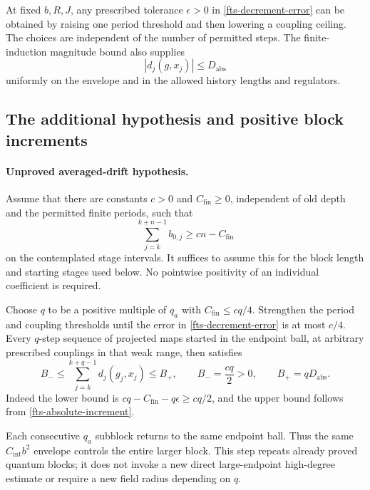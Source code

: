 At fixed $b,R,J$, any prescribed tolerance $\epsilon>0$
in \eqref{fts-decrement-error} can be obtained by raising
one period threshold and then lowering a coupling ceiling.
The choices are independent of the number of permitted
steps. The finite-induction magnitude bound also supplies
\begin{equation}
                 |d_j(g,x_j)|\leq D_{\mathrm{abs}}
 \label{fts-absolute-increment}
\end{equation}
uniformly on the envelope and in the allowed history lengths
and regulators.

\subsection{The additional hypothesis and positive block increments}
\label{fts-hypothesis-section}

\paragraph{Unproved averaged-drift hypothesis.}
Assume that there are constants $c>0$ and
$C_{\mathrm{fin}}\geq0$, independent of old depth and the
permitted finite periods, such that
\begin{equation}
       \sum_{j=k}^{k+n-1}b_{0,j}\geq cn-C_{\mathrm{fin}}
 \label{fts-drift-hypothesis}
\end{equation}
on the contemplated stage intervals. It suffices to assume
this for the block length and starting stages used below.
No pointwise positivity of an individual coefficient is required.

Choose $q$ to be a positive multiple of $q_a$ with
$C_{\mathrm{fin}}\leq cq/4$. Strengthen the period and
coupling thresholds until the error in
\eqref{fts-decrement-error} is at most $c/4$. Every $q$-step
sequence of projected maps started in the endpoint ball,
at arbitrary prescribed couplings in that weak range, then
satisfies
\begin{equation}
 B_-\leq\sum_{j=k}^{k+q-1}d_j(g_j,x_j)\leq B_+,
 \qquad
 B_-=\frac{cq}{2}>0,\qquad B_+=qD_{\mathrm{abs}}.
 \label{fts-block-decrements}
\end{equation}
Indeed the lower bound is
$cq-C_{\mathrm{fin}}-q\epsilon\geq cq/2$, and the upper
bound follows from \eqref{fts-absolute-increment}.

Each consecutive $q_a$ subblock returns to the same endpoint
ball. Thus the same $C_{\mathrm{int}}b^2$ envelope controls
the entire larger block. This step repeats already proved
quantum blocks; it does not invoke a new direct large-endpoint
high-degree estimate or require a new field radius depending
on $q$.

